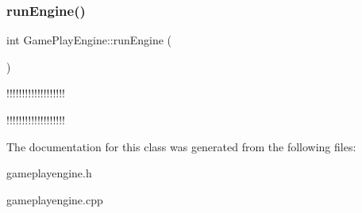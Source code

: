 \subsubsection{\texorpdfstring{run\+Engine()}{runEngine()}}
{\footnotesize\ttfamily int Game\+Play\+Engine\+::run\+Engine (\begin{DoxyParamCaption}{ }\end{DoxyParamCaption})}

!!!!!!!!!!!!!!!!!!!

!!!!!!!!!!!!!!!!!!! 

The documentation for this class was generated from the following files\+:\begin{DoxyCompactItemize}
\item 
gameplayengine.\+h\item 
gameplayengine.\+cpp\end{DoxyCompactItemize}
